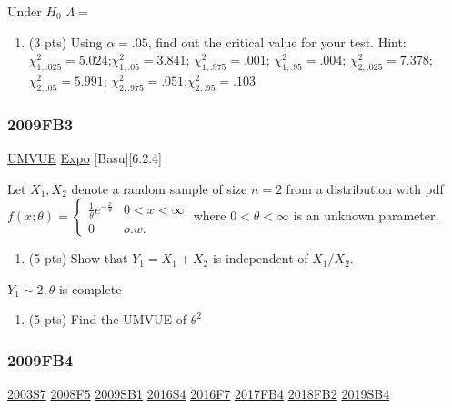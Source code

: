 \documentclass[10pt,twocolumn,portrait]{article}
\providecommand{\tightlist}{%
  \setlength{\itemsep}{0pt}\setlength{\parskip}{0pt}}
\begin{document}
Under \(H_0\) \(\Lambda=\)

\begin{enumerate}
\def\labelenumi{(\alph{enumi})}
\setcounter{enumi}{2}
\tightlist
\item
  (3 pts) Using \(\alpha=.05\), find out the critical value for your
  test. Hint: \(\chi^2_{1,.025}= 5.024\);\(\chi^2_{1,.05}= 3.841\);
  \(\chi^2_{1,.975}=.001\); \(\chi^2_{1,.95}=.004\);
  \(\chi^2_{2,.025}=7.378\); \(\chi^2_{2,.05}= 5.991\);
  \(\chi^2_{2,.975}=.051\);\(\chi^2_{2,.95}=.103\)
\end{enumerate}

\hypertarget{fb3}{%
\subsubsection{2009FB3}\label{fb3}}

\protect\hyperlink{section-5}{UMVUE} \protect\hyperlink{Expo}{Expo}
{[}Basu{]}{[}6.2.4{]}

Let \(X_1,X_2\) denote a random sample of size \(n=2\) from a
distribution with pdf
\(f(x;\theta)=\begin{cases}\frac1\theta e^{-\frac{x}\theta}& 0<x<\infty\\0& o.w.\end{cases}\)
where \(0<\theta<\infty\) is an unknown parameter.

\begin{enumerate}
\def\labelenumi{(\alph{enumi})}
\tightlist
\item
  (5 pts) Show that \(Y_1=X_1+X_2\) is independent of \(X_1/X_2\).
\end{enumerate}

\(Y_1\sim 2,\theta\) is complete

\begin{enumerate}
\def\labelenumi{(\alph{enumi})}
\setcounter{enumi}{1}
\tightlist
\item
  (5 pts) Find the UMVUE of \(\theta^2\)
\end{enumerate}

\hypertarget{fb4}{%
\subsubsection{2009FB4}\label{fb4}}

\protect\hyperlink{s7}{2003S7} \protect\hyperlink{f5-3}{2008F5}
\protect\hyperlink{sb1}{2009SB1} \protect\hyperlink{s4-4}{2016S4}
\protect\hyperlink{f7-5}{2016F7} \protect\hyperlink{fb4-3}{2017FB4}
\protect\hyperlink{fb2-4}{2018FB2} \protect\hyperlink{sb4-2}{2019SB4}
\end{document}
